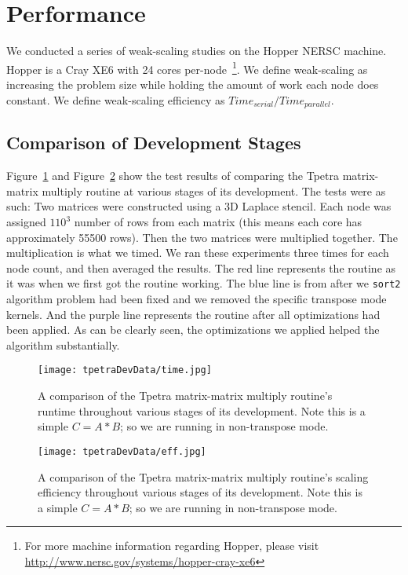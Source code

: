 \documentclass[pdf,12pt, strict]{SANDreport}
\begin{document}
\section{Performance}
\label{perfSect}
We conducted a series of weak-scaling studies on the Hopper NERSC machine. Hopper is a Cray XE6 with 24 cores
per-node~\footnote{For more machine information regarding Hopper, please visit \url{http://www.nersc.gov/systems/hopper-cray-xe6}}.
We define weak-scaling as increasing the problem size while holding the amount of work each node does constant. We define
weak-scaling efficiency as $Time_{serial}/Time_{parallel}$.

\subsection{Comparison of Development Stages}
Figure~\ref{tpetracomptime} and Figure~\ref{tpetracompeff} show the test results of comparing the Tpetra matrix-matrix multiply 
routine at various stages of its 
development.  The tests were as such: Two matrices were constructed using a 3D Laplace stencil. Each node was assigned 
$110^3$ number of rows from each matrix (this means each core has approximately 55500 rows). 
Then the two matrices were multiplied together. The multiplication is what 
we timed. We ran these experiments three times for each node count, and then averaged the results.
The red line represents the routine as it was when we first got the routine working. The blue line is from after 
we \verb!sort2! algorithm problem had been fixed and we removed the specific transpose mode kernels. 
And the purple line represents the routine after all optimizations had been applied.
As can be clearly seen, the optimizations we applied helped the algorithm substantially.

\begin{figure}
\centering
\texttt{[image: tpetraDevData/time.jpg]}
\caption[Tpetra Development Time Comparison]{A comparison of the Tpetra matrix-matrix multiply routine's runtime 
throughout various stages of its development. Note this is a simple $C=A*B$; so we are running in non-transpose mode.}
\label{tpetracomptime}
\end{figure}

\begin{figure}
\centering
\texttt{[image: tpetraDevData/eff.jpg]}
\caption[Tpetra Development Efficiency Comparison]{A comparison of the Tpetra matrix-matrix multiply routine's scaling efficiency
throughout various stages of its development. Note this is a simple $C=A*B$; so we are running in non-transpose mode.}
\label{tpetracompeff}
\end{figure}
\end{document}
